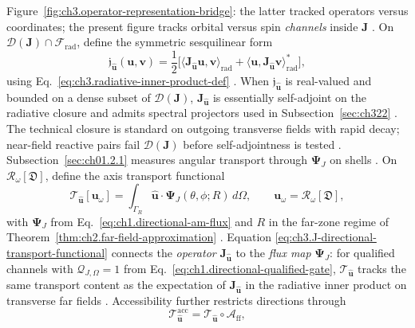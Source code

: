 Figure~\ref{fig:ch3.operator-representation-bridge}: the latter tracked operators versus coordinates; the
present figure tracks orbital versus spin \emph{channels} inside \(\mathbf{J}\) \cite{belinfante1940}.
On \(\mathcal{D}(\mathbf{J})\cap\mathcal{F}_{\mathrm{rad}}\), define the symmetric sesquilinear form
\begin{equation}
\label{eq:ch3.J-symmetric-pairing}
\mathfrak{j}_{\hat{\mathbf{u}}}(\mathbf{u},\mathbf{v})
=
\frac{1}{2}\Big[
\langle \mathbf{J}_{\hat{\mathbf{u}}}\mathbf{u},\mathbf{v}\rangle_{\mathrm{rad}}
+
\langle \mathbf{u},\mathbf{J}_{\hat{\mathbf{u}}}\mathbf{v}\rangle_{\mathrm{rad}}^{*}
\Big],
\end{equation}
using Eq.~\eqref{eq:ch3.radiative-inner-product-def} \cite{stratton1941}. When
\(\mathfrak{j}_{\hat{\mathbf{u}}}\) is real-valued and bounded on a dense subset of
\(\mathcal{D}(\mathbf{J})\), \(\mathbf{J}_{\hat{\mathbf{u}}}\) is essentially self-adjoint on the radiative
closure and admits spectral projectors used in Subsection~\ref{sec:ch322} \cite{kato1995}. The
technical closure is standard on outgoing transverse fields with rapid decay; near-field reactive pairs fail
\(\mathcal{D}(\mathbf{J})\) before self-adjointness is tested \cite{stratton1941}.
Subsection~\ref{sec:ch01.2.1} measures angular transport through \(\boldsymbol{\Psi}_J\) on shells
\cite{stratton1941}. On \(\mathcal{R}_\omega[\mathfrak{D}]\), define the axis transport
functional
\begin{equation}
\label{eq:ch3.J-directional-transport-functional}
\mathcal{T}_{\hat{\mathbf{u}}}[\mathbf{u}_\omega]
=
\int_{\Gamma_R}
\hat{\mathbf{u}}\cdot\boldsymbol{\Psi}_J(\theta,\phi;R)\,d\Omega,
\qquad
\mathbf{u}_\omega=\mathcal{R}_\omega[\mathfrak{D}],
\end{equation}
with \(\boldsymbol{\Psi}_J\) from Eq.~\eqref{eq:ch1.directional-am-flux} and \(R\) in the far-zone regime of
Theorem~\ref{thm:ch2.far-field-approximation} \cite{stratton1941}. Equation
\eqref{eq:ch3.J-directional-transport-functional} connects the \emph{operator} \(\mathbf{J}_{\hat{\mathbf{u}}}\)
to the \emph{flux map} \(\boldsymbol{\Psi}_J\): for qualified channels with
\(\mathcal{Q}_{J,\Omega}=1\) from Eq.~\eqref{eq:ch1.directional-qualified-gate},
\(\mathcal{T}_{\hat{\mathbf{u}}}\) tracks the same transport content as the expectation of
\(\mathbf{J}_{\hat{\mathbf{u}}}\) in the radiative inner product on transverse far fields
\cite{belinfante1940}. Accessibility further restricts directions through
\begin{equation}
\label{eq:ch3.J-accessibility-composition}
\mathcal{T}_{\hat{\mathbf{u}}}^{\mathrm{acc}}
=
\mathcal{T}_{\hat{\mathbf{u}}}\circ\mathcal{A}_{\mathrm{ff}},
\end{equation}
